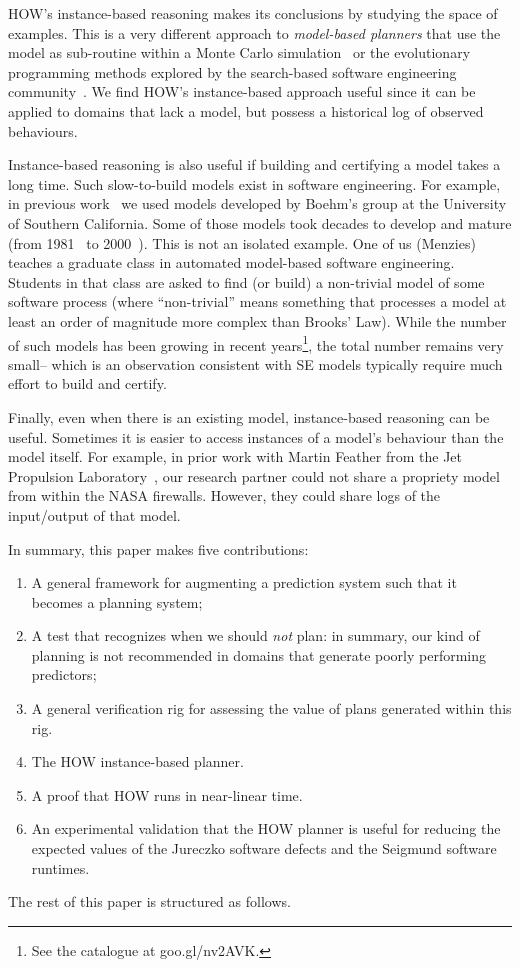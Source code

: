 \documentclass[conference]{IEEEtran}
\newcommand{\be}{\begin{enumerate}}
\newcommand{\ee}{\end{enumerate}}
\begin{document}
HOW's instance-based reasoning  makes its conclusions by
studying the space of examples. This is a very different approach to
{\em model-based planners} that use the model
as sub-routine within a Monte Carlo simulation~\cite{me07f} or the evolutionary 
programming methods explored by the search-based software
engineering community~\cite{krall14,harman12dec}. 
We find   HOW's instance-based approach useful since it can be applied
to domains that lack a model, but possess a historical log of observed behaviours.

Instance-based reasoning is also useful if building and certifying a model   takes a long time. Such slow-to-build models exist in software engineering. For  example, in previous work~\cite{me07f} we used models
developed by Boehm's group at the University of Southern California.
Some of those models took decades to develop and mature (from 1981~\cite{boehm81} to 2000~\cite{boehm00b}).  This is not an isolated example. One of us (Menzies) teaches a graduate class in automated model-based software engineering. 
Students in that class are asked to find (or build) a non-trivial model of
some software process (where ``non-trivial'' means something that processes
a  model at least an order of magnitude more complex than Brooks' Law). 
While the  number of such models has been growing in recent years\footnote{See the
catalogue at goo.gl/nv2AVK.}, 
the total number remains very small-- which is an observation consistent with
SE models typically require  much effort to build and certify.

Finally, even when there is an existing model, instance-based reasoning can be useful.
Sometimes  it is easier to access instances of a model's behaviour than the model
itself. For example, in prior work with Martin  Feather from the Jet Propulsion 
Laboratory~\cite{fea02a},  our research partner could not share a
propriety model from within the NASA firewalls. However, they could share 
logs of the input/output of that model.
 
In summary, this paper makes five contributions:
\be
\item A general framework for augmenting a prediction system such that
it becomes a planning system;
\item A  test that recognizes  when we should {\em not}  plan: in summary, our kind of planning is
not recommended in domains that  generate poorly performing predictors;
\item A general verification rig for assessing the value of plans generated within this rig.
\item The HOW  instance-based planner.
\item A proof that HOW runs in near-linear time.
\item An experimental validation that the HOW planner is useful for reducing the
expected values of the Jureczko software defects and the Seigmund software runtimes.
\ee
The rest of this paper is structured as follows.
\end{document}
